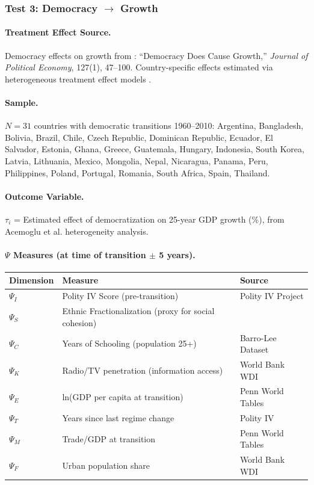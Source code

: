 \subsubsection{Test 3: Democracy $\rightarrow$ Growth}

\paragraph{Treatment Effect Source.}
Democracy effects on growth from \citet{acemoglu2019democracy}: ``Democracy Does Cause Growth,'' \textit{Journal of Political Economy}, 127(1), 47--100. Country-specific effects estimated via heterogeneous treatment effect models \citep{atheyimbens2019,mullainathan2017}.

\paragraph{Sample.}
$N = 31$ countries with democratic transitions 1960--2010: Argentina, Bangladesh, Bolivia, Brazil, Chile, Czech Republic, Dominican Republic, Ecuador, El Salvador, Estonia, Ghana, Greece, Guatemala, Hungary, Indonesia, South Korea, Latvia, Lithuania, Mexico, Mongolia, Nepal, Nicaragua, Panama, Peru, Philippines, Poland, Portugal, Romania, South Africa, Spain, Thailand.

\paragraph{Outcome Variable.}
$\tau_i$ = Estimated effect of democratization on 25-year GDP growth (\%), from Acemoglu et al. heterogeneity analysis.

\paragraph{$\Psi$ Measures (at time of transition $\pm$ 5 years).}
\begin{center}
\small
\begin{tabular}{@{}lll@{}}
\toprule
\textbf{Dimension} & \textbf{Measure} & \textbf{Source} \\
\midrule
$\Psi_I$ & Polity IV Score (pre-transition) & Polity IV Project \\
$\Psi_S$ & Ethnic Fractionalization (proxy for social cohesion) \citep{alesina} \\
$\Psi_C$ & Years of Schooling (population 25+) & Barro-Lee Dataset \\
$\Psi_K$ & Radio/TV penetration (information access) & World Bank WDI \\
$\Psi_E$ & ln(GDP per capita at transition) & Penn World Tables \\
$\Psi_T$ & Years since last regime change & Polity IV \\
$\Psi_M$ & Trade/GDP at transition & Penn World Tables \\
$\Psi_F$ & Urban population share & World Bank WDI \\
\bottomrule
\end{tabular}
\end{center}

